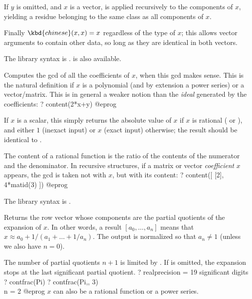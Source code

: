 If $y$ is omitted, and $x$ is a vector,  is applied recursively
to the components of $x$, yielding a residue belonging to the same class as all
components of $x$.

Finally $\kbd{chinese}(x,x) = x$ regardless of the type of $x$; this allows
vector arguments to contain other data, so long as they are identical in both
vectors.

The library syntax is .
 is also available.

\label{se:content}
Computes the gcd of all the coefficients of $x$,
when this gcd makes sense. This is the natural definition
if $x$ is a polynomial (and by extension a power series) or a
vector/matrix. This is in general a weaker notion than the \emph{ideal}
generated by the coefficients:
\bprog
? content(2*x+y)
@eprog

If $x$ is a scalar, this simply returns the absolute value of $x$ if $x$ is
rational ( or ), and either $1$ (inexact input) or $x$
(exact input) otherwise; the result should be identical to .

The content of a rational function is the ratio of the contents of the
numerator and the denominator. In recursive structures, if a
matrix or vector \emph{coefficient} $x$ appears, the gcd is taken
not with $x$, but with its content:
\bprog
? content([ [2], 4*matid(3) ])
@eprog

The library syntax is .

\label{se:contfrac}
Returns the row vector whose components are the partial quotients of the
 expansion of $x$. In other words, a result
$[a_0,\dots,a_n]$ means that $x \approx a_0+1/(a_1+\dots+1/a_n)$. The
output is normalized so that $a_n \neq 1$ (unless we also have $n = 0$).

The number of partial quotients $n+1$ is limited by . If
 is omitted, the expansion stops at the last significant partial
quotient.
\bprog
? 
  realprecision = 19 significant digits
? contfrac(Pi)
? contfrac(Pi,, 3)  \\ n = 2
@eprog\noindent
$x$ can also be a rational function or a power series.

